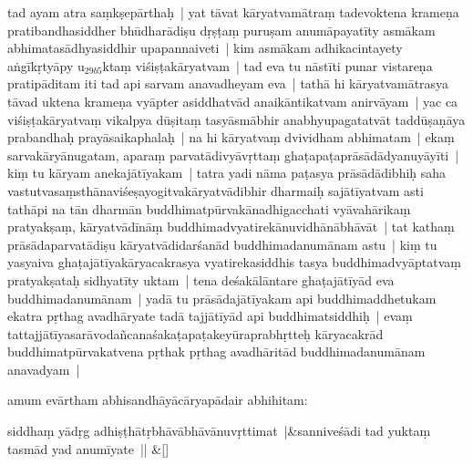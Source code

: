 \documentclass[article,12pt,a4paper]{memoir}%
\newcounter{parCount}
\begin{document}
	  \pstart \leavevmode%
	\label{thakur75-52.22}tad ayam atra saṃkṣepārthaḥ | yat tāvat kāryatvamātraṃ tadevoktena krameṇa pratibandhasiddher bhūdharādiṣu dṛṣṭaṃ puruṣam anumāpayatīty asmākam abhimata\label{ratnakīrtinibandhāvali__36r1PF7IMUXEUF5YNC0LPJ2WOMW}sādhyasiddhir\label{ratnakīrtinibandhāvali__36r1PF7IMUWHI4JVCPCDFPY7PX4} upapannaiveti | kim asmākam adhikacintayety aṅgīkṛtyāpy u{\tiny $_{29b5}$}ktaṃ viśiṣṭakāryatvam | tad eva tu nāstīti punar vistareṇa pratipāditam iti tad api sarvam anavadheyam eva | tathā hi kāryatvamātrasya tāvad uktena krameṇa vyāpter asiddhatvād anaikāntikatvam anirvāyam | yac ca viśiṣṭakāryatvaṃ vikalpya dūṣitaṃ tasyāsmābhir anabhyupagatatvāt taddūṣaṇāya prabandhaḥ prayāsaikaphalaḥ | na hi kāryatvaṃ dvividham abhimatam | ekaṃ sarvakāryānugatam, aparaṃ parvatādivyāvṛttaṃ ghaṭapaṭaprāsādādyanuyāyīti | kiṃ tu kāryam anekajātīyakam | tatra yadi nāma paṭasya prāsādādibhiḥ saha vastutvasaṃsthānaviśeṣayogitvakāryatvādibhir dharmaiḥ sajātīyatvam asti tathāpi na tān dharmān buddhimatpūrvakānadhigacchati vyāvahārikaṃ pratyakṣaṃ, kāryatvādīnāṃ buddhimadvyatirekānuvidhānābhāvāt | tat kathaṃ prāsādaparvatādiṣu kāryatvādidarśanād buddhimadanumānam astu | kiṃ tu yasyaiva ghaṭajātīyakāryacakrasya vyatirekasiddhis tasya buddhimadvyāptatvaṃ pratyakṣataḥ sidhyatīty uktam | tena deśakālāntare ghaṭajātīyād eva buddhimadanumānam | yadā tu prāsādajātīyakam api buddhimaddhetukam ekatra pṛthag avadhāryate tadā tajjātīyād api buddhimatsiddhiḥ | evaṃ tattajjātīyasarāvodañcanaśakaṭapaṭakeyūraprabhṛtteḥ kāryacakrād buddhimatpūrvakatvena pṛthak pṛthag avadhāritād buddhimadanumānam anavadyam |
	{}
	\pend%
      

	  \pstart \leavevmode%
	amum evārtham abhisandhāyācāryapādair abhihitam:
	{}
	\pend%
      
	    
	    \stanza[\smallbreak]
	  siddhaṃ yādṛg adhiṣṭhātṛbhāvābhāvānuvṛttimat |&sanniveśādi tad yuktaṃ tasmād yad anumīyate || \&[\smallbreak]
	  
\end{document}
